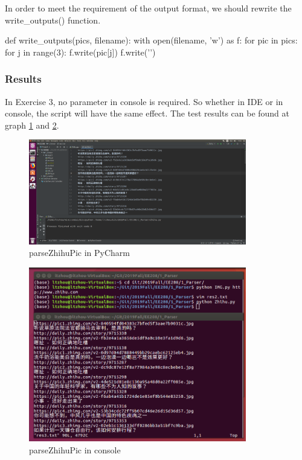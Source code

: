 \documentclass{article}
\begin{document}
In order to meet the requirement of the output format, we should rewrite the write\_outputs() function.
\begin{python}
def write_outputs(pics, filename):
    with open(filename, 'w') as f:
        for pic in pics:
            for j in range(3):
                f.write(pic[j])
                f.write('\n')
\end{python}

\subsubsection{Results}

In Exercise 3, no parameter in console is required. So whether in IDE or in console, the script will have the same effect. The test results can be found at graph \ref{img:3.1} and \ref{img:3.2}.

\begin{figure}[htbp]
\centering
\includegraphics[width=9.5cm]{img/test3_1.png}
\caption{parseZhihuPic in PyCharm}
\label{img:3.1}
\end{figure}

\begin{figure}[htbp]
\centering
\includegraphics[width=9.5cm]{img/test3_2.png}
\caption{parseZhihuPic in console}
\label{img:3.2}
\end{figure}
\end{document}
